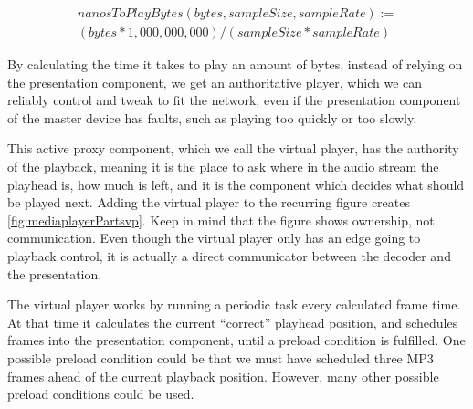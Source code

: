 \begin{equation}\label{eq:ntpb}
	\begin{split}
		nanosToPlayBytes(bytes, sampleSize, sampleRate) :=\\
		(bytes * 1,000,000,000) / (sampleSize * sampleRate)
	\end{split}
\end{equation}

By calculating the time it takes to play an amount of bytes, instead of relying on the
presentation component, we get an authoritative player, which we can
reliably control and tweak to fit the network, even if the presentation component of the master
device has faults, such as playing too quickly
or too slowly.

This active proxy component, which we call the virtual player, has the
authority of the playback, meaning it is the place to ask where in the
audio stream the playhead is, how much is left, and it is the component
which decides what should be played next. Adding the virtual player to
the recurring figure creates \cref{fig:mediaplayerPartsvp}. Keep in mind
that the figure shows ownership, not communication. Even though the
virtual player only has an edge going to playback control, it is actually
a direct communicator between the decoder and the presentation.

The virtual player works by running a periodic task every calculated
frame time. At that time it calculates the current ``correct'' playhead
position, and schedules frames into the presentation component, until
a preload condition is fulfilled. One possible preload condition could be
that we must have scheduled three MP3 frames ahead of the current playback
position. However, many other possible preload conditions could be used.

